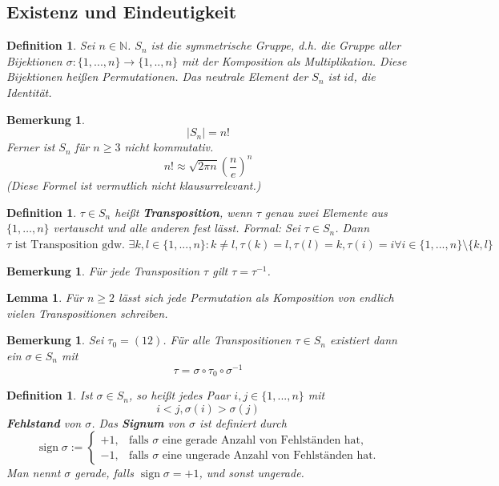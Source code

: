 \documentclass[12pt,a4paper]{article}
\theoremstyle{plain}
\newtheorem{Lemma}[Theorem]{Lemma}
\newtheorem{Definition}[Theorem]{Definition}
\newtheorem{Bemerkung}[Theorem]{Bemerkung}
\newcommand{\herv}[1]{{\emph{\textbf{#1}}}}
\numberwithin{equation}{section}
\begin{document}
\subsection{Existenz und Eindeutigkeit}
\begin{Definition}
Sei $n\in\mathbb N$. \herv{$S_n$} ist die symmetrische Gruppe, d.h. die Gruppe aller Bijektionen
$\sigma\colon \{1,...,n\}\rightarrow \{1,..,n\}$
mit der Komposition als Multiplikation. Diese Bijektionen heißen Permutationen. Das neutrale Element der $S_n$ ist $id$, die Identität.
\end{Definition}
\begin{Bemerkung}
\[\lvert S_n\rvert=n!\]
Ferner ist $S_n$ für $n\geq 3$ nicht kommutativ.
\[n!\approx \sqrt{2\pi n}\left(\frac n e\right)^n\]
(Diese Formel ist vermutlich nicht klausurrelevant.)
\end{Bemerkung}
\begin{Definition}
$\tau\in S_n$ heißt \herv{Transposition}, wenn $\tau$ genau zwei Elemente aus $\{1,\ldots ,n\}$ vertauscht und alle anderen fest lässt. Formal: Sei $\tau\in S_n$. Dann
$\tau \text{ ist Transposition gdw. }\exists k,l\in\{1,...,n\}\colon k\neq l, \tau(k)=l,\tau(l)=k,\tau(i)=i\forall i\in\{1,...,n\}\setminus\{k,l\}$
\end{Definition}
\begin{Bemerkung}
Für jede Transposition $\tau$ gilt $\tau=\tau^{-1}$.
\end{Bemerkung}
\begin{Lemma}
Für $n\geq 2$ lässt sich jede Permutation als Komposition von endlich vielen Transpositionen schreiben.
\end{Lemma}
\begin{Bemerkung}
Sei $\tau_0=(12)$. Für alle Transpositionen $\tau\in S_n$ existiert dann ein $\sigma\in S_n$ mit
\[\tau=\sigma\circ\tau_0\circ\sigma^{-1}\]
\end{Bemerkung}
\begin{Definition}
Ist $\sigma\in S_n$, so heißt jedes Paar $i,j\in\{1,...,n\}$ mit
\[i<j, \sigma(i)>\sigma(j)\]
\herv{Fehlstand} von $\sigma$.
Das \herv{Signum} von $\sigma$ ist definiert durch
\[\operatorname{sign}\sigma:=\left\{\begin{array}{ll} +1, &\text{falls }\sigma\text{ eine gerade Anzahl von Fehlständen hat,}\\ -1,&\text{falls } \sigma \text{ eine ungerade Anzahl von Fehlständen hat.}\end{array}\right.\]
Man nennt $\sigma$ gerade, falls $\operatorname{sign}\sigma=+1$, und sonst ungerade.
\end{Definition}
\end{document}
